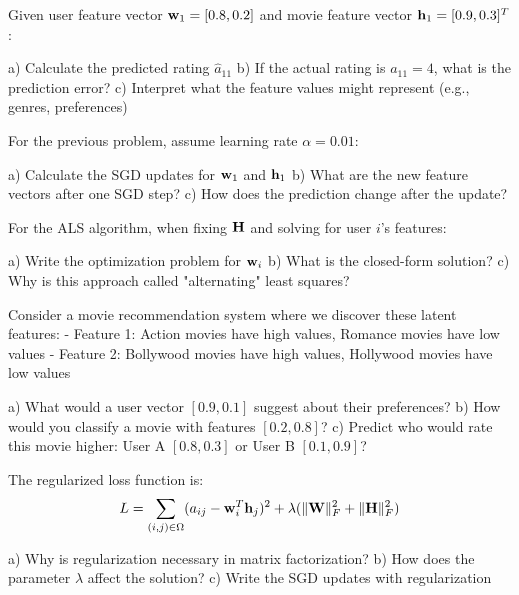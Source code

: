 \documentclass{article}
\begin{document}
\begin{problembox}[title=Prediction Calculation]

Given user feature vector $\mathbf{w}_1 = [0.8, 0.2]$ and movie feature vector $\mathbf{h}_1 = [0.9, 0.3]^T$:

a) Calculate the predicted rating $\hat{a}_{11}$
b) If the actual rating is $a_{11} = 4$, what is the prediction error?
c) Interpret what the feature values might represent (e.g., genres, preferences)
\end{problembox}

\begin{problembox}[title=SGD Update Step]

For the previous problem, assume learning rate $\alpha = 0.01$:

a) Calculate the SGD updates for $\mathbf{w}_1$ and $\mathbf{h}_1$
b) What are the new feature vectors after one SGD step?
c) How does the prediction change after the update?
\end{problembox}

\begin{problembox}[title=ALS Formulation]

For the ALS algorithm, when fixing $\mathbf{H}$ and solving for user $i$'s features:

a) Write the optimization problem for $\mathbf{w}_i$
b) What is the closed-form solution?
c) Why is this approach called "alternating" least squares?
\end{problembox}

\begin{problembox}[title=Latent Feature Interpretation]

Consider a movie recommendation system where we discover these latent features:
- Feature 1: Action movies have high values, Romance movies have low values
- Feature 2: Bollywood movies have high values, Hollywood movies have low values

a) What would a user vector $[0.9, 0.1]$ suggest about their preferences?
b) How would you classify a movie with features $[0.2, 0.8]$?
c) Predict who would rate this movie higher: User A $[0.8, 0.3]$ or User B $[0.1, 0.9]$?
\end{problembox}

\begin{problembox}[title=Regularization in Matrix Factorization]

The regularized loss function is:
$$L = \sum_{(i,j) \in \Omega} (a_{ij} - \mathbf{w}_i^T \mathbf{h}_j)^2 + \lambda(\|\mathbf{W}\|_F^2 + \|\mathbf{H}\|_F^2)$$

a) Why is regularization necessary in matrix factorization?
b) How does the parameter $\lambda$ affect the solution?
c) Write the SGD updates with regularization
\end{problembox}
\end{document}
